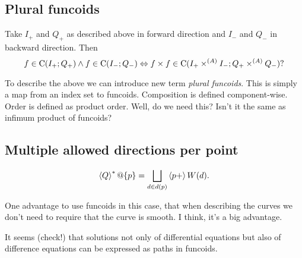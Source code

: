 \subsection{Plural funcoids}

Take $I_+$ and $Q_+$ as described above in forward direction and $I_-$ and $Q_-$ in backward direction. Then
\[ f\in\mathrm{C}(I_+;Q_+)\land f\in\mathrm{C}(I_-;Q_-) \Leftrightarrow f\times f\in\mathrm{C}(I_+\times^{(A)}I_-;Q_+\times^{(A)}Q_-)? \]

To describe the above we can introduce new term \emph{plural funcoids}. This is simply a map
from an index set to funcoids. Composition is defined component-wise. Order is defined as product order.
Well, do we need this? Isn't it the same as infimum product of funcoids?

\subsection{Multiple allowed directions per point}

\[ \rsupfun{Q}@\{p\} = \bigsqcup_{d\in d(p)} \supfun{p+} W(d). \]

One advantage to use funcoids in this case, that when describing the curves we don't need to require that the curve is smooth. I think, it's a big advantage.

It seems (check!) that solutions not only of differential equations but also of difference equations can be
expressed as paths in funcoids.